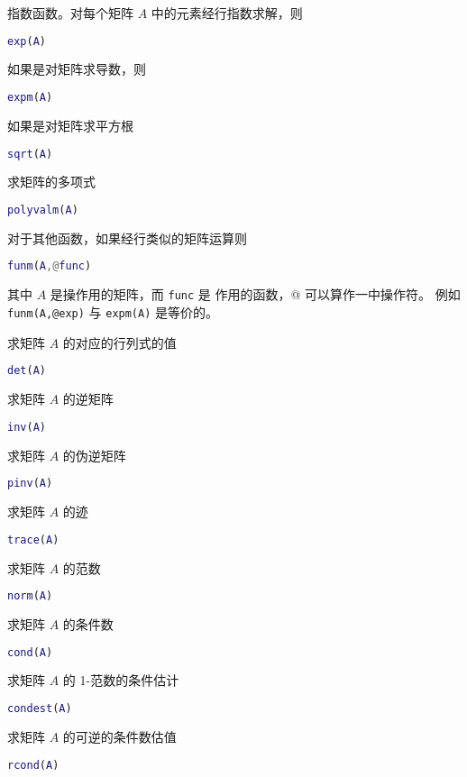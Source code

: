 \documentclass{ctexart}
\begin{document}
 指数函数。对每个矩阵 $A$ 中的元素经行指数求解，则
 \begin{lstlisting}[language=matlab]
 exp(A)
 \end{lstlisting}
 如果是对矩阵求导数，则
 \begin{lstlisting}[language=matlab]
 expm(A)
 \end{lstlisting}
 如果是对矩阵求平方根
 \begin{lstlisting}[language=matlab]
 sqrt(A)
 \end{lstlisting}
 求矩阵的多项式
 \begin{lstlisting}[language=matlab]
 polyvalm(A)
 \end{lstlisting}
 对于其他函数，如果经行类似的矩阵运算则
 \begin{lstlisting}[language=matlab]
 funm(A,@func)
 \end{lstlisting}
 其中 $A$ 是操作用的矩阵，而 \lstinline|func| 是 作用的函数，@ 可以算作一中操作符。
 例如 \lstinline|funm(A,@exp)| 与 \lstinline|expm(A)| 是等价的。
 
 求矩阵 $A$ 的对应的行列式的值
 \begin{lstlisting}[language=matlab]
 det(A)
 \end{lstlisting}
 
 求矩阵 $A$ 的逆矩阵
 \begin{lstlisting}[language=matlab]
 inv(A)
 \end{lstlisting}
 
 求矩阵 $A$ 的伪逆矩阵
 \begin{lstlisting}[language=matlab]
 pinv(A)
 \end{lstlisting}
 
 求矩阵 $A$ 的迹
 \begin{lstlisting}[language=matlab]
 trace(A)
 \end{lstlisting}
 
 求矩阵 $A$ 的范数
 \begin{lstlisting}[language=matlab]
 norm(A)
 \end{lstlisting}
 
 求矩阵 $A$ 的条件数
 \begin{lstlisting}[language=matlab]
 cond(A)
 \end{lstlisting}
 
 求矩阵 $A$ 的 1-范数的条件估计
 \begin{lstlisting}[language=matlab]
 condest(A)
 \end{lstlisting}
 
 求矩阵 $A$ 的可逆的条件数估值
 \begin{lstlisting}[language=matlab]
 rcond(A)
 \end{lstlisting}
 
\end{document}
